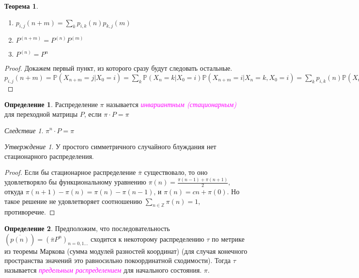 \documentclass[a4paper,100pt]{article}
\theoremstyle{indented}
\newtheorem{theorem}{Теорема}
\theoremstyle{definition}
\newtheorem{defn}{Определение}
\theoremstyle{remark}
\newtheorem{cons}{Следствие}
\newtheorem{stat}{Утверждение}
\begin{document}
\begin{theorem} \
  \begin{enumerate}
    \item $p_{i, j}(n+m)=\sum_{k}p_{i, k}(n)p_{k, j}(m)$
    \item $P^{(n+m)}=P^{(n)}P^{(m)}$
    \item $P^{(n)}=P^n$
  \end{enumerate}
\end{theorem}

\begin{proof}
Докажем первый пункт, из которого сразу будут следовать остальные. $p_{i, j}(n+m)=\mathbb{P}(X_{n+m}=j | X_0=i)=\sum_k \mathbb{P}(X_n=k | X_0=i) \mathbb{P}(X_{n+m}=i | X_n=k, X_0=i)=\sum_{k}p_{i, k}(n)\mathbb{P}(X_{n+m}=i | X_n=k)=\sum_{k}p_{i, k}(n)p_{k, j}(m)$
\end{proof}

\begin{defn}
Распределение $\pi$ называется \hypertarget{n33}{\textcolor{magenta}{\textit{инвариантным (стационарным)}}} для переходной матрицы $P$, если $\pi \cdot P = \pi$
\end{defn}

\begin{cons}
$\pi^n \cdot P = \pi$
\end{cons}

\begin{stat}
У простого симметричного случайного блуждания нет стационарного распределения.
\end{stat}

\begin{proof}
Если бы стационарное распределение $\overline{\pi}$ существовало, то оно удовлетворяло бы функциональному уравнению $\pi(n)=\frac{\pi(n-1)+\pi(n+1)}{2}$, откуда $\pi(n+1)-\pi(n)=\pi(n)-\pi(n-1)$, и $\pi(n)=cn+ \pi(0)$. Но такое решение не удовлетворяет соотношению $\sum_{n \in \mathbb{Z}} \pi(n)=1$, противоречие.
\end{proof}

\begin{defn}
Предположим, что последовательность $(\overline{p(n)})=(\overline{\pi}P^n)_{n=0, 1...}$ сходится к некоторому распределению $\tau$ по метрике из теоремы Маркова (сумма модулей разностей координат) (для случая конечного пространства значений это равносильно покоординатной сходимости). Тогда $\tau$ называется \hypertarget{n34}{\textcolor{magenta}{\textit{предельным распределением}}} для начального состояния. $\pi$.
\end{defn}
\end{document}
